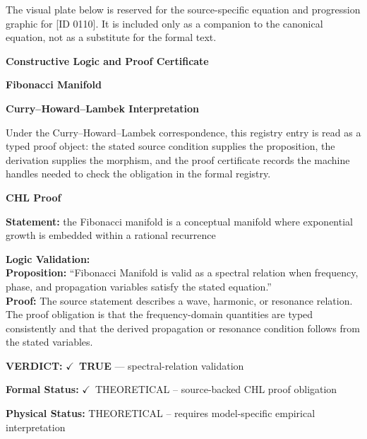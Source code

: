 \begingroup\footnotesize\sloppy
The visual plate below is reserved for the source-specific equation and progression graphic for [ID 0110]. It is included only as a companion to the canonical equation, not as a substitute for the formal text.
\par\endgroup
\ifTZPDarkEdition
{}
\fi

\clearpage
\begingroup\tzpsupportsetup
\noindent\textbf{\fontsize{10.8pt}{12.8pt}\selectfont [ID 0110] Constructive Logic and Proof Certificate}\par
\noindent\textbf{\fontsize{10pt}{12pt}\selectfont Fibonacci Manifold}\par
\vspace{0.45em}
\begingroup
\footnotesize
\setlength{\parskip}{0.22em}
\setlength{\parindent}{0pt}
\noindent\textbf{Curry--Howard--Lambek Interpretation}\par
Under the Curry--Howard--Lambek correspondence, this registry entry is read as a typed proof
object: the stated source condition supplies the proposition, the derivation supplies the
morphism, and the proof certificate records the machine handles needed to check the obligation
in the formal registry.

\vspace{0.45em}
\noindent\textbf{CHL Proof}\par
\textbf{Statement:} the Fibonacci manifold is a conceptual manifold where exponential growth is embedded
within a rational recurrence

\textbf{Logic Validation:}\\
\textbf{Proposition:} ``Fibonacci Manifold is valid as a spectral relation when frequency, phase, and
propagation variables satisfy the stated equation.''\\
\textbf{Proof:} The source statement describes a wave, harmonic, or resonance relation. The proof
obligation is that the frequency-domain quantities are typed consistently and that the
derived propagation or resonance condition follows from the stated variables.

\textbf{VERDICT:} \ensuremath{\checkmark}\ \textbf{TRUE} --- spectral-relation validation

\textbf{Formal Status:} \ensuremath{\checkmark}\ THEORETICAL -- source-backed CHL proof obligation

\textbf{Physical Status:} THEORETICAL -- requires model-specific empirical interpretation
\par\vspace{0.45em}
\par
\ifTZPDarkEdition
{}
\fi
\endgroup
\endgroup
